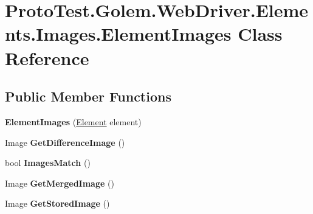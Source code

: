\hypertarget{class_proto_test_1_1_golem_1_1_web_driver_1_1_elements_1_1_images_1_1_element_images}{\section{Proto\-Test.\-Golem.\-Web\-Driver.\-Elements.\-Images.\-Element\-Images Class Reference}
\label{class_proto_test_1_1_golem_1_1_web_driver_1_1_elements_1_1_images_1_1_element_images}
}
\subsection*{Public Member Functions}
\begin{DoxyCompactItemize}
\item 
\hypertarget{class_proto_test_1_1_golem_1_1_web_driver_1_1_elements_1_1_images_1_1_element_images_a37b86a5970bd8e72b33aa0d6e40b6469}{{\bfseries Element\-Images} (\hyperlink{class_proto_test_1_1_golem_1_1_web_driver_1_1_element}{Element} element)}\label{class_proto_test_1_1_golem_1_1_web_driver_1_1_elements_1_1_images_1_1_element_images_a37b86a5970bd8e72b33aa0d6e40b6469}

\item 
\hypertarget{class_proto_test_1_1_golem_1_1_web_driver_1_1_elements_1_1_images_1_1_element_images_a83cc9dc6fe408be2f557459d31963391}{Image {\bfseries Get\-Difference\-Image} ()}\label{class_proto_test_1_1_golem_1_1_web_driver_1_1_elements_1_1_images_1_1_element_images_a83cc9dc6fe408be2f557459d31963391}

\item 
\hypertarget{class_proto_test_1_1_golem_1_1_web_driver_1_1_elements_1_1_images_1_1_element_images_a61a4293a76fa79a7769439b217323a56}{bool {\bfseries Images\-Match} ()}\label{class_proto_test_1_1_golem_1_1_web_driver_1_1_elements_1_1_images_1_1_element_images_a61a4293a76fa79a7769439b217323a56}

\item 
\hypertarget{class_proto_test_1_1_golem_1_1_web_driver_1_1_elements_1_1_images_1_1_element_images_ae4c12f29e95462977fba7042e244f069}{Image {\bfseries Get\-Merged\-Image} ()}\label{class_proto_test_1_1_golem_1_1_web_driver_1_1_elements_1_1_images_1_1_element_images_ae4c12f29e95462977fba7042e244f069}

\item 
\hypertarget{class_proto_test_1_1_golem_1_1_web_driver_1_1_elements_1_1_images_1_1_element_images_a952a52985b58b0662530ea59c4b3fb9a}{Image {\bfseries Get\-Stored\-Image} ()}\label{class_proto_test_1_1_golem_1_1_web_driver_1_1_elements_1_1_images_1_1_element_images_a952a52985b58b0662530ea59c4b3fb9a}


\end{DoxyCompactItemize}
